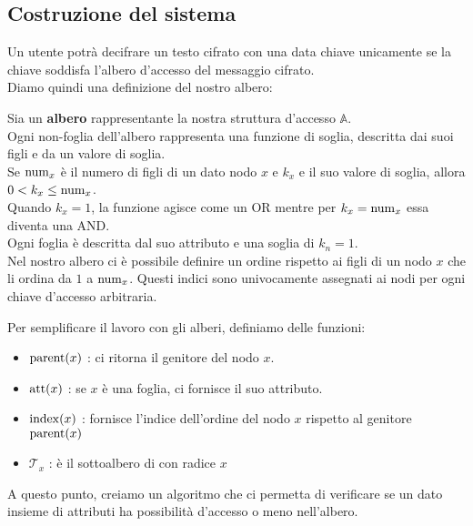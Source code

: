 \subsection{Costruzione del sistema} 

Un utente potrà decifrare un testo cifrato con una data chiave unicamente se la chiave soddisfa l'albero d'accesso del messaggio cifrato.\\[1cm]

Diamo quindi una definizione del nostro albero:\\

\begin{defi}
Sia  un \textbf{albero} rappresentante la nostra struttura d'accesso $\mathbb{A}$.\\
Ogni non-foglia dell'albero rappresenta una funzione di soglia, descritta dai suoi figli e da un valore di soglia.\\
Se $\operatorname{num}_x$ è il numero di figli di un dato nodo $x$ e $k_x$ e il suo valore di soglia, allora $0 < k_x \leq \operatorname{num}_x$.\\
Quando $k_x = 1$, la funzione agisce come un OR mentre per $k_x = \operatorname{num}_x$ essa diventa una AND.\\
Ogni foglia è descritta dal suo attributo e una soglia di $k_n = 1$.\\
Nel nostro albero ci è possibile definire un ordine rispetto ai figli di un nodo $x$ che li ordina da $1$ a $\operatorname{num}_x$. Questi indici sono univocamente assegnati ai nodi per ogni chiave d'accesso arbitraria.
\end{defi}


Per semplificare il lavoro con gli alberi, definiamo delle funzioni:
\begin{itemize}
\item $\operatorname{parent}(x)$ : ci ritorna il genitore del nodo $x$.
\item $\operatorname{att}(x)$ : se $x$ è una foglia, ci fornisce il suo attributo.
\item $\operatorname{index}(x)$ : fornisce l'indice dell'ordine del nodo $x$ rispetto al genitore $\operatorname{parent}(x)$
\item $\mathcal{T}_x$ : è il sottoalbero di  con radice $x$ 
\end{itemize}

A questo punto, creiamo un algoritmo che ci permetta di verificare se un dato insieme di attributi ha possibilità d'accesso o meno nell'albero.\\[1cm]

